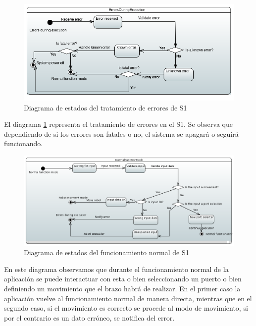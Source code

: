 \begin{figure}[H]
    \centering
    \includegraphics[width=\linewidth]{pictures/S1ErrorsDuringExecution.PNG}
    \caption{Diagrama de estados del tratamiento de errores de \ac{S1}}
    \label{fig:diagrama_estados_error_s1}
\end{figure}

El diagrama \ref{fig:diagrama_estados_error_s1} representa el tratamiento de errores en el \ac{S1}.
Se observa que dependiendo de si los errores son fatales o no, el sistema se apagará o seguirá funcionando.

\begin{figure}[H]
    \centering
    \includegraphics[width=\linewidth]{pictures/S1NormalFunctionMode.PNG}
    \caption{Diagrama de estados del funcionamiento normal de \ac{S1}}
    \label{fig:diagrama_estados_normal_s1}
\end{figure}

En este diagrama observamos que durante el funcionamiento normal de la aplicación se puede interactuar con esta o bien seleccionando un puerto o bien definiendo un movimiento que el brazo habrá de realizar.
En el primer caso la aplicación vuelve al funcionamiento normal de manera directa, mientras que en el segundo caso, si el movimiento es correcto se procede al modo de movimiento, si por el contrario es un dato erróneo, se notifica del error.

